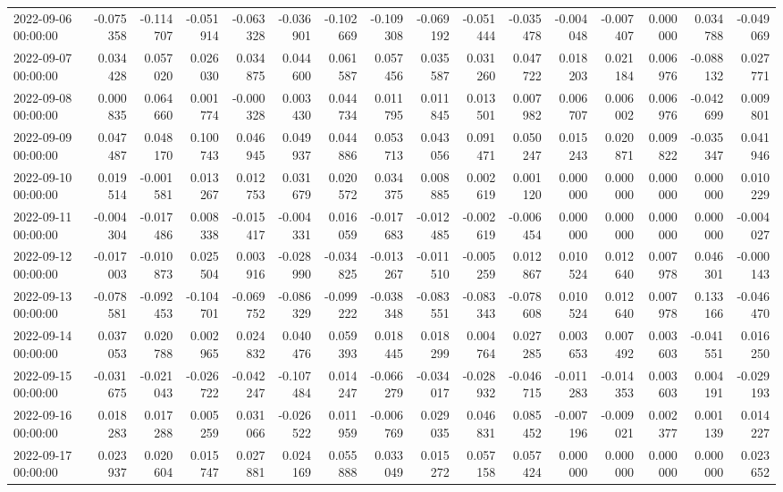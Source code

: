 \begin{tabular}{lrrrrrrrrrrrrrrr}
2022-09-06 00:00:00 & -0.075358 & -0.114707 & -0.051914 & -0.063328 & -0.036901 & -0.102669 & -0.109308 & -0.069192 & -0.051444 & -0.035478 & -0.004048 & -0.007407 & 0.000000 & 0.034788 & -0.049069 \\
2022-09-07 00:00:00 & 0.034428 & 0.057020 & 0.026030 & 0.034875 & 0.044600 & 0.061587 & 0.057456 & 0.035587 & 0.031260 & 0.047722 & 0.018203 & 0.021184 & 0.006976 & -0.088132 & 0.027771 \\
2022-09-08 00:00:00 & 0.000835 & 0.064660 & 0.001774 & -0.000328 & 0.003430 & 0.044734 & 0.011795 & 0.011845 & 0.013501 & 0.007982 & 0.006707 & 0.006002 & 0.006976 & -0.042699 & 0.009801 \\
2022-09-09 00:00:00 & 0.047487 & 0.048170 & 0.100743 & 0.046945 & 0.049937 & 0.044886 & 0.053713 & 0.043056 & 0.091471 & 0.050247 & 0.015243 & 0.020871 & 0.009822 & -0.035347 & 0.041946 \\
2022-09-10 00:00:00 & 0.019514 & -0.001581 & 0.013267 & 0.012753 & 0.031679 & 0.020572 & 0.034375 & 0.008885 & 0.002619 & 0.001120 & 0.000000 & 0.000000 & 0.000000 & 0.000000 & 0.010229 \\
2022-09-11 00:00:00 & -0.004304 & -0.017486 & 0.008338 & -0.015417 & -0.004331 & 0.016059 & -0.017683 & -0.012485 & -0.002619 & -0.006454 & 0.000000 & 0.000000 & 0.000000 & 0.000000 & -0.004027 \\
2022-09-12 00:00:00 & -0.017003 & -0.010873 & 0.025504 & 0.003916 & -0.028990 & -0.034825 & -0.013267 & -0.011510 & -0.005259 & 0.012867 & 0.010524 & 0.012640 & 0.007978 & 0.046301 & -0.000143 \\
2022-09-13 00:00:00 & -0.078581 & -0.092453 & -0.104701 & -0.069752 & -0.086329 & -0.099222 & -0.038348 & -0.083551 & -0.083343 & -0.078608 & 0.010524 & 0.012640 & 0.007978 & 0.133166 & -0.046470 \\
2022-09-14 00:00:00 & 0.037053 & 0.020788 & 0.002965 & 0.024832 & 0.040476 & 0.059393 & 0.018445 & 0.018299 & 0.004764 & 0.027285 & 0.003653 & 0.007492 & 0.003603 & -0.041551 & 0.016250 \\
2022-09-15 00:00:00 & -0.031675 & -0.021043 & -0.026722 & -0.042247 & -0.107484 & 0.014247 & -0.066279 & -0.034017 & -0.028932 & -0.046715 & -0.011283 & -0.014353 & 0.003603 & 0.004191 & -0.029193 \\
2022-09-16 00:00:00 & 0.018283 & 0.017288 & 0.005259 & 0.031066 & -0.026522 & 0.011959 & -0.006769 & 0.029035 & 0.046831 & 0.085452 & -0.007196 & -0.009021 & 0.002377 & 0.001139 & 0.014227 \\
2022-09-17 00:00:00 & 0.023937 & 0.020604 & 0.015747 & 0.027881 & 0.024169 & 0.055888 & 0.033049 & 0.015272 & 0.057158 & 0.057424 & 0.000000 & 0.000000 & 0.000000 & 0.000000 & 0.023652 \\

\end{tabular}
